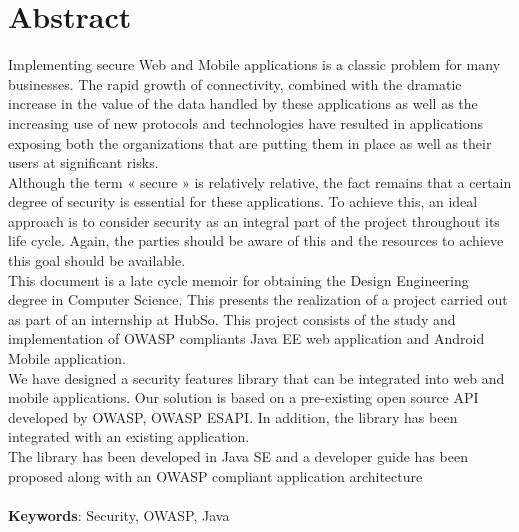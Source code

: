 
\chapter*{Abstract}

Implementing secure Web and Mobile applications is a classic problem for many businesses. The rapid growth of connectivity, combined with the dramatic increase in the value of the data handled by these applications as well as the increasing use of new protocols and technologies have resulted in applications exposing both the organizations that are putting them in place as well as their users at significant risks.\\
Although the term « secure » is relatively relative, the fact remains that a certain degree of security is essential for these applications. To achieve this, an ideal approach is to consider security as an integral part of the project throughout its life cycle. Again, the parties should be aware of this and the resources to achieve this goal should be available.\\
This document is a late cycle memoir for obtaining the Design Engineering degree in Computer
Science. This presents the realization of a project carried out as part of an internship at HubSo. This project consists of the study and implementation of OWASP compliants Java EE web application and Android Mobile application.\\
We have designed a security features library that can be integrated into web and mobile applications. Our solution is based on a pre-existing open source API developed by OWASP, OWASP ESAPI. In addition, the library has been integrated with an existing application.\\
The library has been developed in Java SE and a developer guide has been proposed along with an OWASP compliant application architecture\\ \\
\textbf{Keywords}: Security, OWASP, Java

\clearpage
